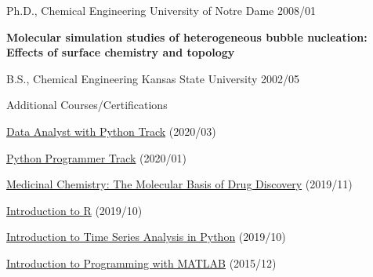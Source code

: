 
\begin{cventries}
  \cventry
    {Ph.D., Chemical Engineering} %
    {University of Notre Dame} %
    {} %
    {2008/01} %
    {
      \begin{cvitems} %
         \item {\textbf{Molecular simulation studies of heterogeneous bubble nucleation:  Effects of surface chemistry and topology}}
      \end{cvitems}
    }
    
    \cventry
      {B.S., Chemical Engineering}
      {Kansas State University}
      {}
      {2002/05}
      {}

  \vspace{-10pt}
      
  \cventry
    {}
    {Additional Courses/Certifications}
    {}
    {}
    {
        \begin{cvitems} 
            \item{\href{https://www.datacamp.com/statement-of-accomplishment/track/7171f97d35d807ece49c6e38c3d945583d4ae9dd}{Data Analyst with Python Track} (2020/03)}
            \item{\href{https://www.datacamp.com/statement-of-accomplishment/track/546928503f3ccea8a2ef53a6040f43997381f967}{Python Programmer Track} (2020/01)}
            \item{\href{https://courses.edx.org/certificates/27307d91954041dab94af0ff554bc378}{Medicinal Chemistry: The Molecular Basis of Drug Discovery} (2019/11)}
            \item{\href{https://www.datacamp.com/statement-of-accomplishment/course/dd5746b9564cf374bcc0bb379e1801925e25259e}{Introduction to R} (2019/10)}
            \item {\href{https://www.datacamp.com/statement-of-accomplishment/course/807548ea866063da3c0083afcebf3be48d44f277}{Introduction to Time Series Analysis in Python} (2019/10)}
            \item {\href{https://www.coursera.org/account/accomplishments/verify/9G7V69L6QP}{Introduction to Programming with MATLAB} (2015/12)}
        \end{cvitems}      
    }

\end{cventries}
